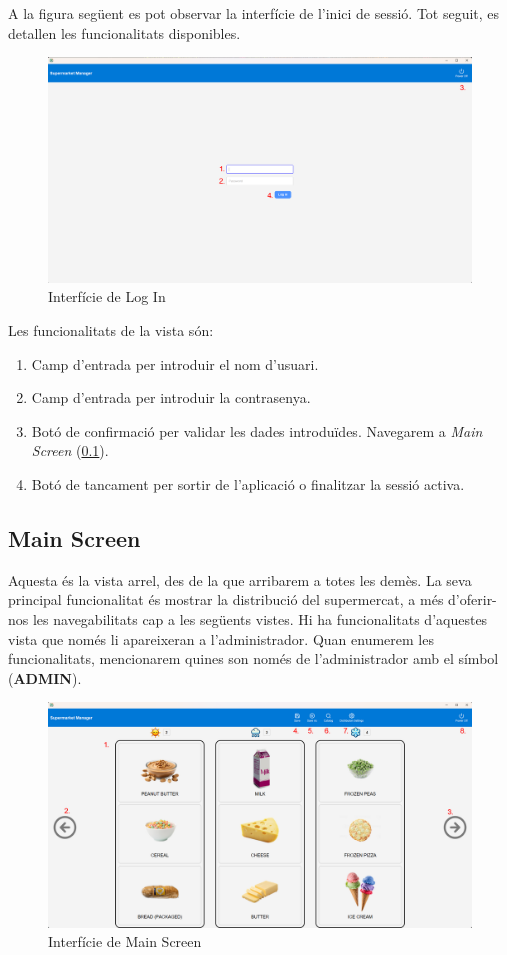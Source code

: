 \documentclass[a4paper,12pt]{article}
\begin{document}
	A la figura següent es pot observar la interfície de l'inici de sessió. Tot seguit, es detallen les funcionalitats disponibles.
	
	\begin{figure}[H] 
		\centering
		\includegraphics[width=0.75\linewidth]{assets/login.png}
		\caption{Interfície de Log In}
	\end{figure}
	
	\noindent Les funcionalitats de la vista són:
	
	\begin{enumerate}[itemsep=0pt, topsep=0pt]
		\item Camp d'entrada per introduir el nom d'usuari.
		\item Camp d'entrada per introduir la contrasenya.
		\item Botó de confirmació per validar les dades introduïdes. Navegarem a \textit{Main Screen} (\ref{sec:mainScreen}).
		\item Botó de tancament per sortir de l'aplicació o finalitzar la sessió activa.
	\end{enumerate}
	
	\newpage
	\subsection{Main Screen}
	\label{sec:mainScreen}
	
	Aquesta és la vista arrel, des de la que arribarem a totes les demès. La seva principal funcionalitat és mostrar la distribució del supermercat, a més d'oferir-nos les navegabilitats cap a les següents vistes. Hi ha funcionalitats d'aquestes vista que només li apareixeran a l'administrador. Quan enumerem les funcionalitats, mencionarem quines son només de l'administrador amb el símbol (\textbf{ADMIN}).
	
	\begin{figure}[H] 
		\centering
		\includegraphics[width=0.75\linewidth]{assets/mainscreen.png}
		\caption{Interfície de Main Screen}
	\end{figure}
	
\end{document}
